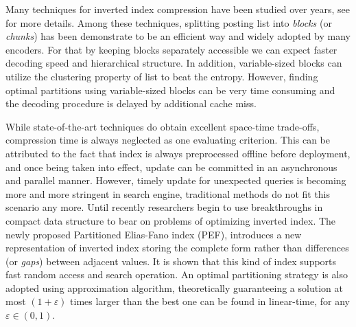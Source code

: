 \documentclass[runningheads,a4paper]{llncs}
\begin{document}
Many techniques for inverted index compression have been studied over years, see \cite{catena2014inverted,trotman2014compression} for more details.
Among these techniques, splitting posting list into \textit{blocks} (or \textit{chunks}) has been demonstrate to be an efficient way and widely adopted by many encoders.
For that by keeping blocks separately accessible we can expect faster decoding speed and hierarchical structure.
In addition, variable-sized blocks can utilize the clustering property of list to beat the entropy\cite{silvestri2010vsencoding,moffat2000binary}.
However, finding optimal partitions using variable-sized blocks can be very time consuming and the decoding procedure is delayed by additional cache miss.


While state-of-the-art techniques do obtain excellent space-time trade-offs, compression time is always neglected as one evaluating criterion.
This can be attributed to the fact that index is always preprocessed offline before deployment, and once being taken into effect, update can be committed in an asynchronous and parallel manner.
However, timely update for unexpected queries is becoming more and more stringent in search engine, traditional methods do not fit this scenario any more.
Until recently researchers begin to use breakthroughs in compact data structure to bear on problems of optimizing inverted index\cite{navarro2010dual,petri2014score}.
The newly proposed Partitioned Elias-Fano index (PEF), introduces a new representation of inverted index storing the complete form rather than differences (or \textit{gaps}) between adjacent values\cite{ottaviano2014partitioned,vigna2013quasi}.
It is shown that this kind of index supports fast random access and search operation.
An optimal partitioning strategy is also adopted using approximation algorithm, theoretically guaranteeing a solution at most $\left(1+\varepsilon\right)$ times larger than the best one can be found in linear-time, for any $ \varepsilon \in \left(0,1\right) $.
\end{document}
